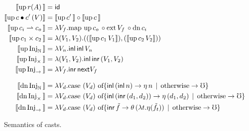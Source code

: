 \begin{figure*}
  \begin{align*}
    \sem{\upc{r(A)}} &= \id \\
    \sem{\upc{c \comp c'}(V)} &= \sem{\upc{c'}} \circ \sem{\upc{c}} \\
    \sem{\upc{c_i \ra c_o}} &=
      \lambda V_f . \text{map } \upc{c_o} \circ \ext{V_f}{} \circ \dnc{c_i} \\
    \sem{\upc{c_1 \times c_2}} &= 
      \lambda (V_1, V_2) . ((\sem{\upc{c_1} V_1}) , 
                            (\sem{\upc{c_2} V_2})) \\
    \sem{\upc{\inat}} &= 
      \lambda V_n . \inl\, \inl\, V_n \\
    \sem{\upc{\itimes}} &= 
      \lambda (V_1, V_2) . \inl\, \inr\, (V_1 , V_2) \\
    \sem{\upc{\iarr}} &= 
      \lambda V_f . \inr\, \nxt V_f \\[2ex]
    \sem{\dnc{\inat}} &=
      \lambda V_d . \text{case $({V_d})$ of}
      \{ \inl\, (\inl\, n) \to \eta\, n
         \alt \text{otherwise} \to \mho \} \\
    \sem{\dnc{\itimes}} &=
      \lambda V_d . \text{case $({V_d})$ of}
      \{ \inl\, (\inr\, (d_1, d_2)) \to \eta\, (d_1, d_2)
         \alt \text{otherwise} \to \mho \} \\
    \sem{\dnc{\iarr}} &=
      \lambda V_d . \text{case $({V_d})$ of}
      \{ \inr\, \tilde{f} \to \theta\, (\lambda t. \eta (\tilde{f}_t))
         \alt \text{otherwise} \to \mho \} \\
  \end{align*}

  \caption{Semantics of casts.}
  \label{fig:term-semantics}
\end{figure*}





